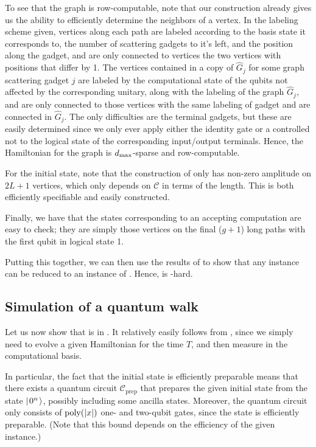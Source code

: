 \documentclass[../thesis-main/thesis-main]{subfiles}
\begin{document}
To see that the graph is row-computable, note that our construction already gives us the ability to efficiently determine the neighbors of a vertex. In the labeling scheme given, vertices along each path are labeled according to the basis state it corresponds to, the number of scattering gadgets to it's left, and the position along the gadget, and are only connected to vertices the two vertices with positions that differ by 1.  The vertices contained in a copy of $\widehat{G}_j$ for some graph scattering gadget $j$ are labeled by the computational state of the qubits not affected by the corresponding unitary, along with the labeling of the graph $\widehat{G}_j$, and are only connected to those vertices with the same labeling of gadget and are connected in $\widehat{G}_j$.  The only difficulties are the terminal gadgets, but these are easily determined since we only ever apply either the identity gate or a controlled not to the logical state of the corresponding input/output terminals.  Hence, the Hamiltonian for the graph is $d_{\text{max}}$-sparse and row-computable.

For the initial state, note that the construction of  only has non-zero amplitude on $2L + 1$ vertices, which only depends on $\mathcal{C}$ in terms of the length.  This is both efficiently specifiable and easily constructed.

Finally, we have that the states corresponding to an accepting computation are easy to check; they are simply those vertices on the final ($g+1$) long paths with the first qubit in logical state 1. 

Putting this together, we can then use the results of  to show that any \QCircVer instance can be reduced to an instance of \QWE.  Hence, \QWE  is \BQP-hard.



\subsection{Simulation of a quantum walk}

Let us now show that \QWE is in \BQP.  It relatively easily follows from , since we simply need to evolve a given Hamiltonian for the time $T$, and then measure in the computational basis.

In particular, the fact that the initial state is efficiently preparable means that there exists a quantum circuit $\mathcal{C}_{\text{prep}}$ that prepares the given initial state from the state $|\mspace{2mu} 0^n \mspace{2mu} \rangle$, possibly including some ancilla states.  Moreover, the quantum circuit only consists of $\operatorname{poly}(|x|)$ one- and two-qubit gates, since the state is efficiently preparable.  (Note that this bound depends on the efficiency of the given instance.)
\end{document}
